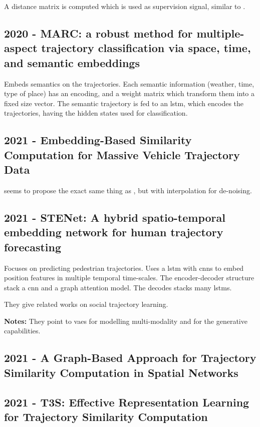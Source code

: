 A distance matrix is computed which is used as supervision signal, similar to \cite{yao2019computing}.

\subsection*{2020 - MARC: a robust method for multiple-aspect trajectory classification via space, time, and semantic embeddings}

\cite{may2020marc} Embeds semantics on the trajectories. Each semantic information (weather, time, type of place) has an encoding, and a weight matrix which transform them into a fixed size vector. The semantic trajectory is fed to an \gls{lstm}, which encodes the trajectories, having the hidden states used for classification.

\subsection*{2021 - Embedding-Based Similarity Computation for Massive Vehicle Trajectory Data}

\cite{chen2021embedding} seems to propose the exact same thing as \cite{yao2019computing}, but with interpolation for de-noising.

\subsection*{2021 - STENet: A hybrid spatio-temporal embedding network for human trajectory forecasting}

\cite{zhang2021stenet} Focuses on predicting pedestrian trajectories. Uses a \gls{lstm} with \glspl{cnn} to embed position features in multiple temporal time-scales. The encoder-decoder structure stack a \gls{cnn} and a graph attention model. The decodes stacks many \glspl{lstm}. 

They give related works on social trajectory learning.

\textbf{Notes:} They point to \glspl{vae} for modelling multi-modality and for the generative capabilities. 

\subsection*{2021 - A Graph-Based Approach for Trajectory Similarity Computation in Spatial Networks}
\cite{han2021graph}

\subsection*{2021 - T3S: Effective Representation Learning for Trajectory Similarity Computation}
\cite{yang2021t3s}


